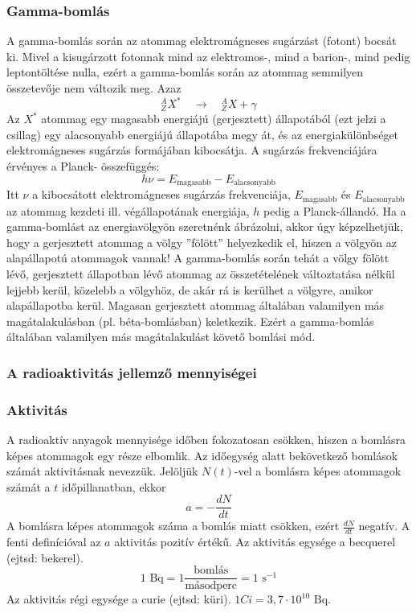 \documentclass[../main.tex]{subfiles}
\begin{document}
\subsubsection{Gamma-bomlás}
A gamma-bomlás során az atommag elektromágneses sugárzást (fotont) bocsát ki. Mivel a kisugárzott fotonnak mind az elektromos-, mind a barion-, mind pedig leptontöltése
nulla, ezért a gamma-bomlás során az atommag semmilyen összetevője nem változik meg. Azaz 
\begin{equation}
    ^A_Z X^* \quad \rightarrow \quad ^A_Z X + \gamma
\end{equation}
Az $X^*$ atommag egy magasabb energiájú (gerjesztett) állapotából (ezt jelzi a csillag) egy
alacsonyabb energiájú állapotába megy át, és az energiakülönbséget elektromágneses sugárzás formájában kibocsátja. A sugárzás frekvenciájára érvényes a Planck- összefüggés:
\begin{equation}
    h\nu = E_{\text{magasabb}} - E_{\text{alacsonyabb}}
\end{equation}
Itt $\nu$ a kibocsátott elektromágneses sugárzás frekvenciája, $E_{\text{magasabb}}$ és $E_{\text{alacsonyabb}}$ az
atommag kezdeti ill. végállapotának energiája, $h$ pedig a Planck-állandó.
Ha a gamma-bomlást az energiavölgyön szeretnénk ábrázolni, akkor úgy képzelhetjük,
hogy a gerjesztett atommag a völgy ”fölött” helyezkedik el, hiszen a völgyön az alapállapotú atommagok vannak! A gamma-bomlás során tehát a völgy fölött lévő, gerjesztett
állapotban lévő atommag az összetételének változtatása nélkül lejjebb kerül, közelebb a
völgyhöz, de akár rá is kerülhet a völgyre, amikor alapállapotba kerül.
Magasan gerjesztett atommag általában valamilyen más magátalakulásban (pl. béta-bomlásban) keletkezik. Ezért a gamma-bomlás általában valamilyen más magátalakulást
követő bomlási mód.

\subsubsection{A radioaktivitás jellemző mennyiségei}
\subsubsection*{Aktivitás}
A radioaktív anyagok mennyisége időben fokozatosan csökken, hiszen a bomlásra képes atommagok egy része elbomlik. Az időegység alatt bekövetkező bomlások számát aktivitásnak nevezzük.
Jelöljük $N(t)$-vel a bomlásra képes atommagok számát a $t$ időpillanatban, ekkor
\begin{equation}
    a = - \frac{dN}{dt}
\end{equation}
A bomlásra képes atommagok száma a bomlás miatt csökken, ezért $\frac{dN}{dt}$ negatív. A fenti definícióval az \(a\) aktivitás pozitív értékű. Az aktivitás egysége a becquerel (ejtsd:
bekerel).
\begin{equation}
    1 \text{ Bq} = 1 \frac{\text{bomlás}}{\text{másodperc}} = 1 \text{ s}^{-1}
\end{equation}
Az aktivitás régi egysége a curie (ejtsd: küri). $1 Ci = 3, 7 \cdot 10^{10} \text{ Bq}$.
\end{document}
